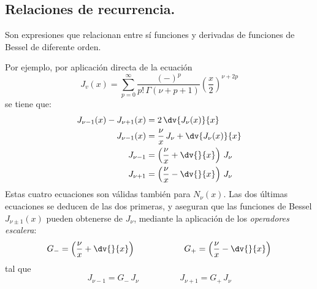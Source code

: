 \subsection{Relaciones de recurrencia.}
Son expresiones que relacionan entre sí funciones y derivadas de funciones de Bessel de diferente orden.
\par
Por ejemplo, por aplicación directa de la ecuación
\begin{equation}
\boxed{J_{v} (x) = \sum_{p=0}^{\infty} \dfrac{(-)^{p}}{p! \, \Gamma (\nu + p + 1)} \left( \dfrac{x}{2} \right)^{\nu+2p}}
\label{eq:ecuacion_08_06}
\end{equation}
se tiene que:
\begin{align*}
J_{\nu-1} (x) - J_{\nu+1} (x)&= 2 \, \dv{J_{\nu}(x)}{x} \\
J_{\nu-1} (x) &= \dfrac{\nu}{x} \, J_{\nu} + \dv{J_{\nu}(x)}{x} \\
J_{\nu-1} &= \left( \dfrac{\nu}{x} + \dv{}{x} \right) \, J_{\nu} \\
J_{\nu+1} &= \left( \dfrac{\nu}{x} - \dv{}{x} \right) \, J_{\nu}
\end{align*}
Estas cuatro ecuaciones son válidas también para $N_{\nu} (x)$. Las dos últimas ecuaciones se deducen de las dos primeras, y aseguran que las funciones de Bessel $J_{\nu \pm 1} (x)$ pueden obtenerse de $J_{\nu}$, mediante la aplicación de los \emph{operadores escalera}:
\[ G_{-} = \left( \dfrac{\nu}{x} + \dv{}{x} \right) \hspace{2cm} G_{+} = \left( \dfrac{\nu}{x} - \dv{}{x} \right) \]
tal que
\[ J_{\nu-1} = G_{-} \, J_{\nu} \hspace{2cm} J_{\nu+1} = G_{+} \, J_{\nu}  \]
